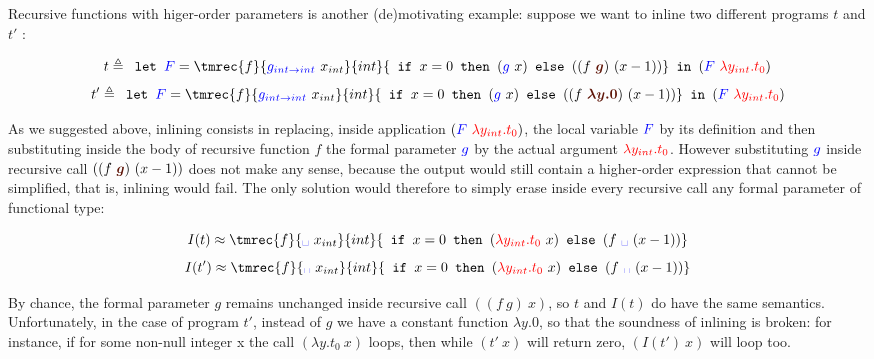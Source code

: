 \documentclass[a4paper,11pt,oneside]{article}
\theoremstyle{plain}
\begin{document}
Recursive functions with  higer-order parameters is another (de)motivating
example: suppose we want to inline two different programs $t$ and $t'$ :\vspace{-0.4cm}
	\begin{figure}[H]
	\label{fig:rec-bad-ex} \hypertarget{rec-bad-ex}{}
		\begin{footnotesize}
	$$ t \triangleq 
		\texttt{ let } \textcolor{blue}{F} =
  		\tmrec{f}{\textcolor{blue}{g_{int \rightarrow int}}~x_{int}}{int} 
  		{\texttt{ if } x = 0 
  		\texttt{ then } (\textcolor{blue}{g}~x) 
  		\texttt{ else }((f~\textcolor{Sepia}{\boldsymbol{g}})~(x - 1))} 
  		\texttt{ in }
  		(\textcolor{blue}{F}~\textcolor{red}{\lambda y_{int}. t_0})$$ 
  $$t' \triangleq 
  \texttt{ let } \textcolor{blue}{F} =
  \tmrec{f}{\textcolor{blue}{g_{int \rightarrow int}}~x_{int}}{int} 
  {\texttt{ if } x = 0 
  \texttt{ then } (\textcolor{blue}{g}~x) 
  \texttt{ else } ((f~\textcolor{Sepia}{\boldsymbol{\lambda y. 0}})~(x-1))} 
  \texttt{ in }(\textcolor{blue}{F}~\textcolor{red}{\lambda y_{int}.t_0}) $$
  \end{footnotesize}
   
  \end{figure}  \vspace{-0.4cm}
\indent As we suggested above, inlining consists in replacing,
inside application $(\textcolor{blue}{F}~\textcolor{red}{\lambda y_{int}. t_0})$, 
the local variable $\textcolor{blue}{F}$ by its definition and
then substituting inside the body of recursive function $f$ the formal parameter
$\textcolor{blue}{g}$ by the actual argument 
$\textcolor{red}{\lambda y_{int}. t_0}$. 
However substituting $\textcolor{blue}{g}$ inside recursive call 
$((f~\textcolor{Sepia}{\boldsymbol{g}})~(x - 1))$ does not make any sense,
because the output would still contain a higher-order expression that cannot be
simplified, that is, inlining would fail. The only solution would therefore to
simply erase inside every recursive call any formal parameter of functional
type:
	\begin{footnotesize}
	$$ I(t) \approx
  \tmrec{f}{\textcolor{blue}{\text{\textvisiblespace}}~x_{int}}{int}
  	{\texttt{ if } x = 0\texttt{ then }(\textcolor{red}{\lambda y_{int}.t_0}~x)
    \texttt{ else } (f~\textcolor{blue}{\text{\textvisiblespace}}~(x-1))} $$
	$$ I(t') \approx
  \tmrec{f}{\textcolor{blue}{\text{\textvisiblespace}}~x_{int}}{int} 
  	{\texttt{ if }x = 0\texttt{ then }(\textcolor{red}{\lambda y_{int}.t_0}~x)
    \texttt{ else }(f~\textcolor{blue}{\text{\textvisiblespace}}~(x-1))} $$
	\end{footnotesize}
\indent By chance, the formal parameter $g$ remains unchanged inside recursive call
$((f~g)~x)$, so $t$ and $I(t)$ do have the same semantics. Unfortunately, in the
case of program $t'$, instead of $g$ we have a constant function
$\lambda y. 0$, so that the soundness of inlining is broken: for instance, if for some
non-null integer x the call $(\lambda y. t_0~x)$ loops, then while $(t'~x)$ will
return zero, $(I(t')~x)$ will loop too. \\
\end{document}
